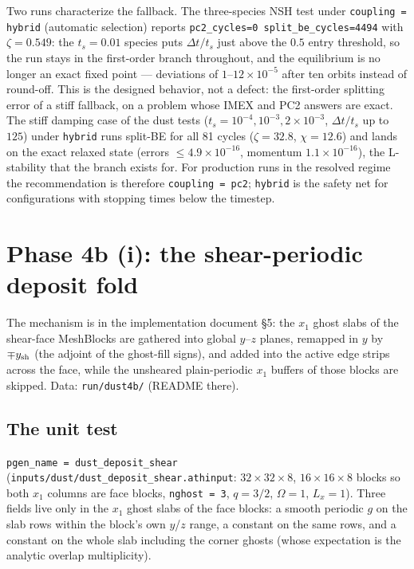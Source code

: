 \documentclass[11pt]{article}
\newcommand{\code}[1]{\texttt{#1}}
\newcommand{\file}[1]{\texttt{#1}}
\newcommand{\Om}{\Omega}
\begin{document}
Two runs characterize the fallback. The three-species NSH test under
\code{coupling = hybrid} (automatic selection) reports
\code{pc2\_cycles=0 split\_be\_cycles=4494} with $\zeta = 0.549$: the $t_s = 0.01$
species puts $\Delta t/t_s$ just above the $0.5$ entry threshold, so the run stays
in the first-order branch throughout, and the equilibrium is no longer an exact
fixed point --- deviations of $1$--$12\times10^{-5}$ after ten orbits instead of
round-off. This is the designed behavior, not a defect: the first-order splitting
error of a stiff fallback, on a problem whose IMEX and PC2 answers are exact. The
stiff damping case of the dust tests ($t_s = 10^{-4}, 10^{-3}, 2\times10^{-3}$,
$\Delta t/t_s$ up to $125$) under \code{hybrid} runs split-BE for all 81 cycles
($\zeta = 32.8$, $\chi = 12.6$) and lands on the exact relaxed state
(errors $\le 4.9\times10^{-16}$, momentum $1.1\times10^{-16}$), the L-stability that
the branch exists for. For production runs in the resolved regime the recommendation
is therefore \code{coupling = pc2}; \code{hybrid} is the safety net for
configurations with stopping times below the timestep.

\section{Phase 4b (i): the shear-periodic deposit fold}
\label{sec:phase4b1}

The mechanism is in the implementation document \S5: the $x_1$ ghost slabs of the
shear-face MeshBlocks are gathered into global $y$--$z$ planes, remapped in $y$ by
$\mp y_{\rm sh}$ (the adjoint of the ghost-fill signs), and added into the active edge
strips across the face, while the unsheared plain-periodic $x_1$ buffers of those
blocks are skipped. Data: \file{run/dust4b/} (README there).

\subsection{The unit test}

\code{pgen\_name = dust\_deposit\_shear} (\file{inputs/dust/dust\_deposit\_shear.athinput}:
$32\times32\times8$, $16\times16\times8$ blocks so both $x_1$ columns are face blocks,
\code{nghost = 3}, $q = 3/2$, $\Om = 1$, $L_x = 1$). Three fields live only in the $x_1$
ghost slabs of the face blocks: a smooth periodic $g$ on the slab rows within the
block's own $y$/$z$ range, a constant on the same rows, and a constant on the whole slab
including the corner ghosts (whose expectation is the analytic overlap multiplicity).
\end{document}
